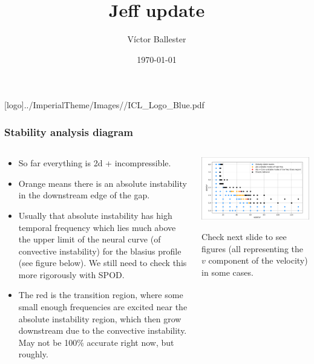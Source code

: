 \documentclass[
  aspectratio=169, %
  t, %
  onlytextwidth, %
  10pt, %
]{beamer}
\title{Jeff update} %
\subtitle{} %
\author{Víctor Ballester} %
\date{\today} %
\def\imagefolder{../ImperialTheme/Images/}
\begin{document}
\begingroup
{} %
[logo]{\imagefolder/ICL_Logo_Blue.pdf} %
\frame[plain, s]{\titlepage} %
\endgroup

\begin{frame}
	\frametitle{Stability analysis diagram}
	\centering

	\begin{columns}[T] %
		\begin{column}{0.47\linewidth} %
			\begin{itemize}
				\item So far everything is 2d + incompressible.
				\item Orange means there is an absolute instability in the downstream edge of the gap.
				\item Usually that absolute instability has high temporal frequency which lies much above the upper limit of the neural curve (of convective instability) for the blasius profile (see figure below). We still need to check this more rigorously with SPOD.
				\item The red is the transition region, where some small enough frequencies are excited near the absolute instability region, which then grow downstream due to the convective instability. May not be 100\% accurate right now, but roughly.
			\end{itemize}
		\end{column}
		\begin{column}{0.52\linewidth} %
			\includegraphics[width=0.98\linewidth]{Images/stabilitycurve.png}

			Check next slide to see figures (all representing the $v$ component of the velocity) in some cases.
		\end{column}
	\end{columns}

\end{frame}
\end{document}
